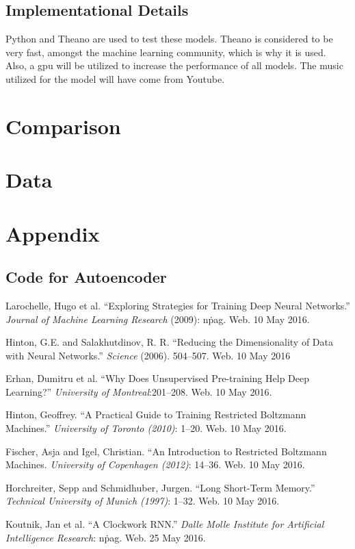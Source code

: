 \documentclass{article}
\begin{document}
\subsection{Implementational Details}
Python and Theano are used to test these models. Theano is considered to be very
fast, amongst the machine learning community, which is why it is used. Also, a
gpu will be utilized to increase the performance of all models. The music
utilized for the model will have come from Youtube.

\section{Comparison}

\section{Data}

\section{Appendix}
\subsection{Code for Autoencoder}
%

\begin{thebibliography}{9}
		Larochelle, Hugo et al. ``Exploring Strategies for Training Deep Neural
		Networks.'' \textit{Journal of Machine Learning Research} (2009): n\. pag.
		Web. 10 May 2016.

		Hinton, G.E. and Salakhutdinov, R. R. ``Reducing the Dimensionality of
		Data with Neural Networks.'' \textit{Science} (2006). 504--507. Web. 10
		May 2016

		Erhan, Dumitru et al. ``Why Does Unsupervised Pre-training Help Deep
		Learning?'' \textit{University of Montreal}:201--208. Web. 10 May 2016.

		Hinton, Geoffrey. ``A Practical Guide to Training Restricted Boltzmann
		Machines.'' \textit{University of Toronto (2010)}: 1--20. Web. 10 May
		2016.

		Fischer, Asja and Igel, Christian. ``An Introduction to Restricted
		Boltzmann Machines. \textit{University of Copenhagen (2012)}: 14--36. Web.
		10 May 2016.

		Horchreiter, Sepp and Schmidhuber, Jurgen. ``Long Short-Term Memory.''
		\textit{Technical University of Munich (1997)}: 1--32. Web. 10 May 2016.

		Koutnik, Jan et al. ``A Clockwork RNN.'' \textit{Dalle Molle Institute
		for Artificial Intelligence Research}: n\. pag. Web. 25 May 2016.

\end{thebibliography}
\end{document}
